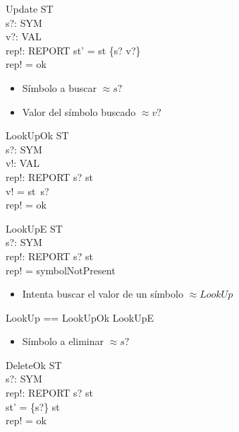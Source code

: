 \begin{schema}{Update}
\Delta ST \\
s?: SYM \\
v?: VAL \\
rep!: REPORT
\where
st' = st \oplus \{s? \mapsto v?\} \\
rep! = ok
\end{schema}

\begin{itemize}
  \item Símbolo a buscar $\approx s?$ \\
  \item Valor del símbolo buscado  $\approx v?$ 
\end{itemize}

\begin{schema}{LookUpOk}
\Xi ST \\
s?: SYM \\
v!: VAL \\
rep!: REPORT
\where
s? \in \dom st \\
v! = st~s? \\
rep! = ok
\end{schema}

\begin{schema}{LookUpE}
\Xi ST \\
s?: SYM \\
rep!: REPORT
\where
s? \notin \dom st \\
rep! = symbolNotPresent
\end{schema}

\begin{itemize}
  \item Intenta buscar el valor de un símbolo $\approx LookUp$ 
\end{itemize}

\begin{zed}
LookUp == LookUpOk \lor LookUpE
\end{zed}

\begin{itemize}
  \item Símbolo a eliminar $\approx s?$ 
\end{itemize}

\begin{schema}{DeleteOk}
\Delta ST \\
s?: SYM \\
rep!: REPORT
\where
s? \in \dom st \\
st' = \{s?\} \ndres st \\
rep! = ok
\end{schema}


